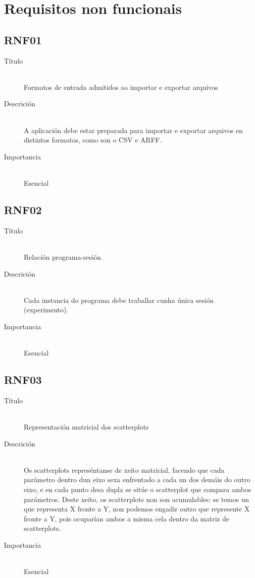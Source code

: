 \section{Requisitos non funcionais}

\subsection*{RNF01}
\begin{description}
\item[Título] \hfill \\
Formatos de entrada admitidos ao importar e exportar arquivos
\item[Descrición] \hfill \\
A aplicación debe estar preparada para importar e exportar arquivos en distintos formatos, como son o CSV e ARFF.
\item[Importancia] \hfill \\
Esencial
\end{description}

\subsection*{RNF02}
\begin{description}
\item[Título] \hfill \\
Relación programa-sesión
\item[Descrición] \hfill \\
Cada instancia do programa debe traballar cunha única sesión (experimento).
\item[Importancia] \hfill \\
Esencial
\end{description}

\subsection*{RNF03}
\begin{description}
\item[Título] \hfill \\
Representación matricial dos scatterplots
\item[Descrición] \hfill \\
Os scatterplots represéntanse de xeito matricial, facendo que cada parámetro dentro dun eixo sexa enfrentado a cada un dos demáis do outro eixo, e en cada punto desa dupla se sitúe o scatterplot que compara ambos parámetros. Deste xeito, os scatterplots non son acumulables: se temos un que representa X fronte a Y, non podemos engadir outro que represente X fronte a Y, pois ocuparían ambos a misma cela dentro da matriz de scatterplots.
\item[Importancia] \hfill \\
Esencial
\end{description}

